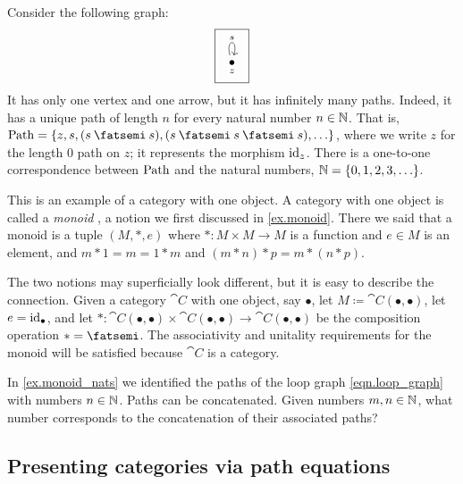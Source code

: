 \documentclass[7Sketches]{subfiles}
\begin{document}
\begin{example}
\label{ex.monoid_nats}%
Consider the following graph:
\begin{equation}%
\label{eqn.loop_graph}
\fbox{
\begin{tikzcd}[ampersand replacement=\&]
	\LMO[under]{z}\ar[loop above, "s"]
\end{tikzcd}
}
\end{equation}
It has only one vertex and one arrow, but it has infinitely many paths. Indeed, it
has a unique path of length $n$ for every natural number $n\in\mathbb{N}$. That is,
$\Set{Path}=\{z, s, (s\cp s), (s\cp s\cp s), \ldots\}$, where we write $z$ for the
length 0 path on $z$; it represents the morphism $\mathrm{id}_z$. There is a one-to-one correspondence between $\mathrm{Path}$
and the natural numbers, $\mathbb{N}=\{0,1,2,3,\ldots\}$.

This is an example of a category with one object. A category with one object is called a
\emph{monoid}%
, a notion we first discussed in \cref{ex.monoid}. There we said that a monoid is a tuple $(M,*,e)$ where $*\colon M\times M\to M$ is a function and $e\in M$ is an element, and $m*1=m=1*m$ and $(m*n)*p=m*(n*p)$.%

The two notions may superficially look different, but it is easy to describe the connection. Given a category $\cat{C}$ with one object, say $\bullet$, let $M\coloneqq\cat{C}(\bullet,\bullet)$, let $e=\mathrm{id}_{\bullet}$, and let $*\colon\cat{C}(\bullet,\bullet)\times\cat{C}(\bullet,\bullet)\to\cat{C}(\bullet,\bullet)$ be the composition operation $*=\cp$. The associativity and unitality requirements for the monoid will be satisfied because $\cat{C}$ is a category.%
%
\end{example}

\begin{exercise}%
\label{exc.nat_comp}
In \cref{ex.monoid_nats} we identified the paths of the loop graph \eqref{eqn.loop_graph} with numbers $n\in\mathbb{N}$. Paths can be concatenated. Given numbers $m,n\in\mathbb{N}$, what number corresponds to the concatenation of their associated paths?
\end{exercise}

\subsection{Presenting categories via path equations}
%
\label{subsec.presenting_cats}
%
\end{document}
